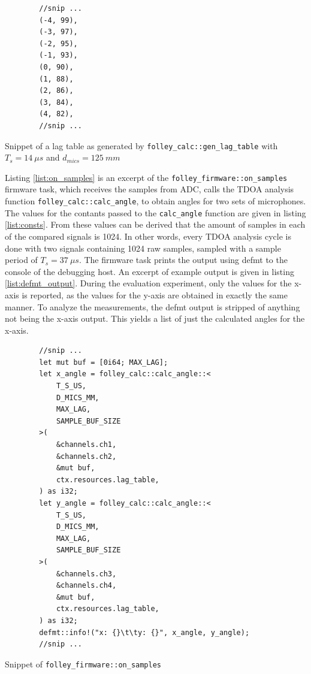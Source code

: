 \documentclass[a4paper]{article}
\newcommand{\rust}[1]{\texttt{#1}}
\begin{document}
\begin{listing}[H]
    \begin{verbatim}
        //snip ...
        (-4, 99),
        (-3, 97),
        (-2, 95),
        (-1, 93),
        (0, 90),
        (1, 88),
        (2, 86),
        (3, 84),
        (4, 82),
        //snip ...
    \end{verbatim}
    \caption{Snippet of a lag table as generated by \rust{folley_calc::gen_lag_table} with $T_s = 14\ \mu s$ and $d_{mics} = 125\ mm$}
    \label{list:lag_table}
\end{listing}

Listing \ref{list:on_samples} is an excerpt of the \newline\rust{folley_firmware::on_samples} firmware task, which receives the samples from ADC, calls the TDOA analysis function \rust{folley_calc::calc_angle}, to obtain angles for two sets of microphones. The values for the contants passed to the \rust{calc_angle} function are given in listing \ref{list:consts}. From these values can be derived that the amount of samples in each of the compared signals is 1024. In other words, every TDOA analysis cycle is done with two signals containing 1024 raw samples, sampled with a sample period of $T_s = 37\ \mu s$. The firmware task prints the output using defmt to the console of the debugging host. An excerpt of example output is given in listing \ref{list:defmt_output}. During the evaluation experiment, only the values for the x-axis is reported, as the values for the y-axis are obtained in exactly the same manner. To analyze the measurements, the defmt output is stripped of anything not being the x-axis output. This yields a list of just the calculated angles for the x-axis.

\begin{listing}[H]
    \begin{verbatim}
        //snip ...
        let mut buf = [0i64; MAX_LAG];
        let x_angle = folley_calc::calc_angle::<
            T_S_US, 
            D_MICS_MM, 
            MAX_LAG, 
            SAMPLE_BUF_SIZE
        >(
            &channels.ch1,
            &channels.ch2,
            &mut buf,
            ctx.resources.lag_table,
        ) as i32;
        let y_angle = folley_calc::calc_angle::<
            T_S_US, 
            D_MICS_MM, 
            MAX_LAG, 
            SAMPLE_BUF_SIZE
        >(
            &channels.ch3,
            &channels.ch4,
            &mut buf,
            ctx.resources.lag_table,
        ) as i32;
        defmt::info!("x: {}\t\ty: {}", x_angle, y_angle);
        //snip ...
\end{verbatim}
    \caption{Snippet of \rust{folley_firmware::on_samples}}
    \label{list:on_samples}
\end{listing}
\end{document}
